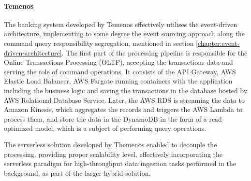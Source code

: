 
\paragraph*{Temenos}

The banking system developed by Temenos effectively utilises the event-driven architecture, implementing to some degree the event sourcing approach along the command query responsibility segregation, mentioned in section \ref{chapter:event-driven-architecture}.
The first part of the processing pipeline is responsible for the Online Transactions Processing (OLTP), accepting the transactions data and serving the role of command operations. It consists of the API Gateway, AWS Elastic Load Balancer, AWS Fargate running containers with the application including the business logic and saving the transactions in the database hosted by AWS Relational Database Service.
Later, the AWS RDS is streaming the data to Amazon Kinesis, which aggregates the records and triggers the AWS Lambda to process them, and store the data in the DynamoDB in the form of a read-optimized model, which is a subject of performing query operations.

The serverless solution developed by Themenos enabled to decouple the processing, providing proper scalability level, effectively incorporating the serverless paradigm for high-throughput data ingestion tasks performed in the background, as part of the larger  hybrid solution.





